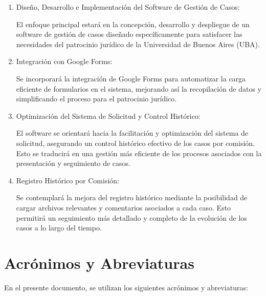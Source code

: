 \begin {enumerate}
\item Diseño, Desarrollo e Implementación del Software de Gestión de Casos:

El enfoque principal estará en la concepción, desarrollo y despliegue de un software de gestión de casos diseñado específicamente para satisfacer las necesidades del patrocinio jurídico de la Universidad de Buenos Aires (UBA).

\item Integración con Google Forms:

Se incorporará la integración de Google Forms para automatizar la carga eficiente de formularios en el sistema, mejorando así la recopilación de datos y simplificando el proceso para el patrocinio jurídico.

\item Optimización del Sistema de Solicitud y Control Histórico:

El software se orientará hacia la facilitación y optimización del sistema de solicitud, asegurando un control histórico efectivo de los casos por comisión. Esto se traducirá en una gestión más eficiente de los procesos asociados con la presentación y seguimiento de casos.

\item Registro Histórico por Comisión:

Se contemplará la mejora del registro histórico mediante la posibilidad de cargar archivos relevantes y comentarios asociados a cada caso. Esto permitirá un seguimiento más detallado y completo de la evolución de los casos a lo largo del tiempo.
\end{enumerate}

\section{Acrónimos y Abreviaturas}
\label{sec:acronimos}

En el presente documento, se utilizan los siguientes acrónimos y abreviaturas:

